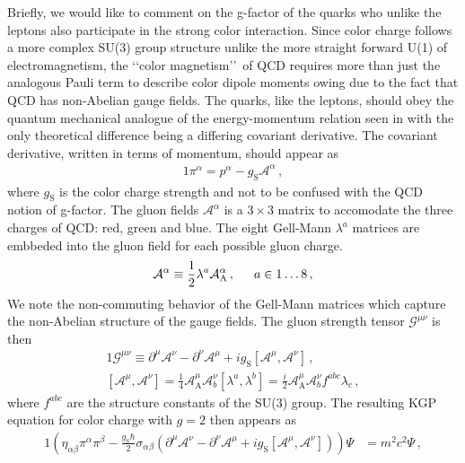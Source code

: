 Briefly, we would like to comment on the g-factor of the quarks who unlike the leptons also participate in the strong color interaction. Since color charge follows a more complex SU(3) group structure unlike the more straight forward U(1) of electromagnetism, the \lq\lq color magnetism\rq\rq\ of QCD requires more than just the analogous Pauli term to describe color dipole moments owing due to the fact that QCD has non-Abelian gauge fields. The quarks, like the leptons, should obey the quantum mechanical analogue of the energy-momentum relation seen in  with the only theoretical difference being a differing covariant derivative. The covariant derivative, written in terms of momentum, should appear as
\begin{alignat}{1}
	\label{eq:spin:08} \pi^{\alpha}=p^{\alpha}-g_\mathrm{S}\mathcal{A}^{\alpha}\,,
\end{alignat}
where $g_\mathrm{S}$ is the color charge strength and not to be confused with the QCD notion of g-factor. The gluon fields $\mathcal{A}^{\alpha}$ is a $3\times3$ matrix to accomodate the three charges of QCD: red, green and blue. The eight Gell-Mann $\lambda^{a}$ matrices are embbeded into the gluon field for each possible gluon charge.
\begin{alignat}{1}
	\label{eq:spin:09} \mathcal{A}^{\alpha}\equiv\frac{1}{2}\lambda^{a}\mathcal{A}^{\alpha}_\mathrm{A}\,,\indent a\in1\ldots8\,,
\end{alignat}
We note the non-commuting behavior of the Gell-Mann matrices which capture the non-Abelian structure of the gauge fields. The gluon strength tensor $\mathcal{G}^{\mu\nu}$ is then
\begin{alignat}{1}
	\label{eq:spin:10a} \mathcal{G}^{\mu\nu}\equiv\partial^{\mu}\mathcal{A}^{\nu}-\partial^{\nu}\mathcal{A}^{\mu}+ig_\mathrm{S}\left[\mathcal{A}^{\mu},\mathcal{A}^{\nu}\right]\,,\\
	\label{eq:spin:10b} \left[\mathcal{A}^{\mu},\mathcal{A}^{\nu}\right] = \frac{1}{4}\mathcal{A}^{\mu}_\mathrm{A}\mathcal{A}^{\nu}_{b}\left[\lambda^{a},\lambda^{b}\right]=\frac{i}{2}\mathcal{A}^{\mu}_\mathrm{A}\mathcal{A}^{\nu}_{b}f^{abc}\lambda_{c}\,,
\end{alignat}
where $f^{abc}$ are the structure constants of the SU(3) group. The resulting KGP equation for color charge with $g\!=\!2$ then appears as
\begin{alignat}{1}
	\label{eq:spin:11} \left(\eta_{\alpha\beta}\pi^{\alpha}\pi^{\beta}-\frac{g_\mathrm{S}\hbar}{2}\sigma_{\alpha\beta}\left(\partial^{\mu}\mathcal{A}^{\nu}-\partial^{\nu}\mathcal{A}^{\mu}+ig_\mathrm{S}\left[\mathcal{A}^{\mu},\mathcal{A}^{\nu}\right]\right)\right)\Psi&=m^{2}c^{2}\Psi\,,
\end{alignat}
